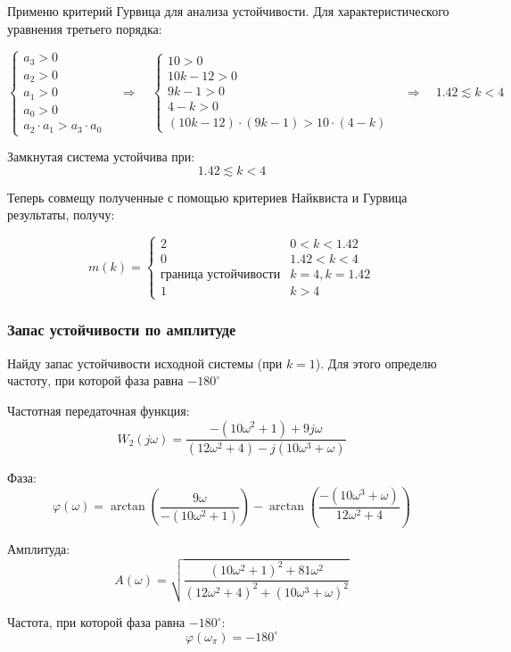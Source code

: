 \documentclass[a4paper,12pt]{article}
\begin{document}
	Применю критерий Гурвица для анализа устойчивости. Для характеристического уравнения третьего порядка:
	
	\[
	\begin{cases}
		a_3 > 0 \\
		a_2 > 0 \\
		a_1 > 0 \\
		a_0 > 0 \\
		a_2 \cdot a_1 > a_3 \cdot a_0
	\end{cases} 
	\quad \Longrightarrow \quad
	\begin{cases}
		10 > 0 \\
		10k - 12 > 0 \\
		9k -1 > 0 \\
		4-k > 0 \\
		(10k - 12) \cdot (9k -1) > 10 \cdot (4-k)
	\end{cases}	
	\quad \Longrightarrow \quad
	1.42 \lesssim k < 4
	\] 
	
	Замкнутая система устойчива при: \[1.42 \lesssim k < 4\]
	
	Теперь совмещу полученные с помощью критериев Найквиста и Гурвица результаты, получу:
	
	\[
	m(k)=
	\begin{cases}
		2 & 0<k<1.42\\
		0 & 1.42<k<4\\
		\text{граница устойчивости} & k=4, k=1.42\\
		1 & k>4
	\end{cases}
	\]
	
	\subsubsection{Запас устойчивости по амплитуде}
	
	
	Найду запас устойчивости исходной системы (при \(k = 1\)). Для этого
	определю частоту, при которой фаза равна \(-180^\circ\)
	
	Частотная передаточная функция:
	\[
	W_2(j \omega) =
	\frac{-(10\omega^2+1) + 9 j \omega}
	{(12\omega^2+4) - j(10\omega^3+\omega)}
	\]
	
	Фаза:
	\[
	\varphi(\omega) =
	\arctan \left(\dfrac{9\omega}{-(10\omega^2+1)} \right)
	-
	\arctan\left(\dfrac{-(10\omega^3+\omega)}{12\omega^2+4}\right)
	\]
	
	Амплитуда:
	\[
	A(\omega)
	=
	\sqrt{
		\dfrac{(10\omega^2+1)^2+81\omega^2}
		{(12\omega^2+4)^2+(10\omega^3+\omega)^2}
	}
	\]
	
	Частота, при которой фаза равна \(-180^\circ\):
	\[
	\varphi(\omega_\pi)=-180^\circ
	\]
	
\end{document}
